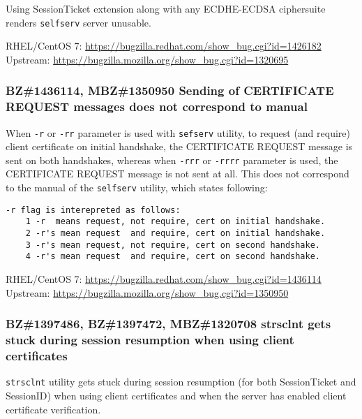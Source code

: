     Using SessionTicket extension along with any ECDHE-ECDSA ciphersuite
    renders \texttt{selfserv} server unusable.

    \medskip\noindent RHEL/CentOS 7: \url{https://bugzilla.redhat.com/show_bug.cgi?id=1426182}
    \newline\noindent Upstream: \url{https://bugzilla.mozilla.org/show_bug.cgi?id=1320695}

\subsubsection*{BZ\#1436114, MBZ\#1350950  \newline
    Sending of CERTIFICATE REQUEST messages does not correspond to manual}

    When \texttt{-r} or \texttt{-rr} parameter is used with \texttt{sefserv}
    utility, to request (and require) client certificate on initial handshake,
    the CERTIFICATE REQUEST message is sent on both handshakes, whereas when
    \texttt{-rrr} or \texttt{-rrrr} parameter is used, the CERTIFICATE REQUEST
    message is not sent at all. This does not correspond to the manual of
    the \texttt{selfserv} utility, which states following:

    \begin{lstlisting}
-r flag is interepreted as follows:
    1 -r  means request, not require, cert on initial handshake.
    2 -r's mean request  and require, cert on initial handshake.
    3 -r's mean request, not require, cert on second handshake.
    4 -r's mean request  and require, cert on second handshake.
    \end{lstlisting}

    \medskip\noindent RHEL/CentOS 7: \url{https://bugzilla.redhat.com/show_bug.cgi?id=1436114}
    \newline\noindent Upstream: \url{https://bugzilla.mozilla.org/show_bug.cgi?id=1350950}

\subsubsection*{BZ\#1397486, BZ\#1397472, MBZ\#1320708  \newline
    strsclnt gets stuck during session resumption when using client certificates}

    \texttt{strsclnt} utility gets stuck during session resumption (for both
    SessionTicket and SessionID) when using client certificates and when the
    server has enabled client certificate verification.

